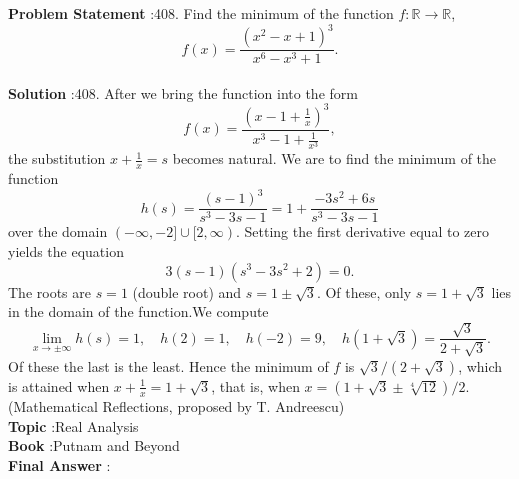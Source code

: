 \documentclass[10pt]{article}
\begin{document}
\textbf{Problem Statement} :408. Find the minimum of the function $f: \mathbb{R} \rightarrow \mathbb{R}$,$$ f(x)=\frac{\left(x^{2}-x+1\right)^{3}}{x^{6}-x^{3}+1} . $$\\
\textbf{Solution} :408. After we bring the function into the form$$ f(x)=\frac{\left(x-1+\frac{1}{x}\right)^{3}}{x^{3}-1+\frac{1}{x^{3}}}, $$the substitution $x+\frac{1}{x}=s$ becomes natural. We are to find the minimum of the function$$ h(s)=\frac{(s-1)^{3}}{s^{3}-3 s-1}=1+\frac{-3 s^{2}+6 s}{s^{3}-3 s-1} $$over the domain $(-\infty,-2] \cup[2, \infty)$. Setting the first derivative equal to zero yields the equation$$ 3(s-1)\left(s^{3}-3 s^{2}+2\right)=0 . $$The roots are $s=1$ (double root) and $s=1 \pm \sqrt{3}$. Of these, only $s=1+\sqrt{3}$ lies in the domain of the function.We compute$$ \lim _{x \rightarrow \pm \infty} h(s)=1, \quad h(2)=1, \quad h(-2)=9, \quad h(1+\sqrt{3})=\frac{\sqrt{3}}{2+\sqrt{3}} . $$Of these the last is the least. Hence the minimum of $f$ is $\sqrt{3} /(2+\sqrt{3})$, which is attained when $x+\frac{1}{x}=1+\sqrt{3}$, that is, when $x=(1+\sqrt{3} \pm \sqrt[4]{12}) / 2$.(Mathematical Reflections, proposed by T. Andreescu)\\
\textbf{Topic} :Real Analysis\\
\textbf{Book} :Putnam and Beyond\\
\textbf{Final Answer} :\\
\end{document}
